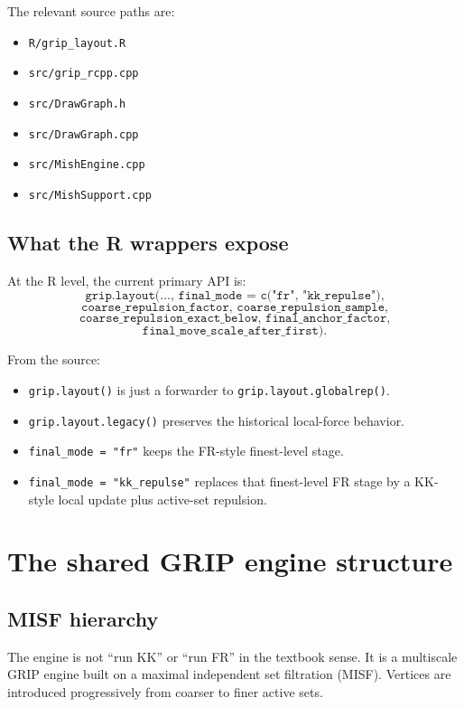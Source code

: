\documentclass[11pt]{article}
\begin{document}
The relevant source paths are:
\begin{itemize}[leftmargin=1.5em]
\item \texttt{R/grip\_layout.R}
\item \texttt{src/grip\_rcpp.cpp}
\item \texttt{src/DrawGraph.h}
\item \texttt{src/DrawGraph.cpp}
\item \texttt{src/MishEngine.cpp}
\item \texttt{src/MishSupport.cpp}
\end{itemize}

\subsection{What the R wrappers expose}

At the R level, the current primary API is:
\[
\texttt{grip.layout(..., final\_mode = c("fr", "kk\_repulse"),}
\]
\[
\texttt{coarse\_repulsion\_factor, coarse\_repulsion\_sample,}
\]
\[
\texttt{coarse\_repulsion\_exact\_below, final\_anchor\_factor,}
\]
\[
\texttt{final\_move\_scale\_after\_first).}
\]

From the source:
\begin{itemize}[leftmargin=1.5em]
\item \texttt{grip.layout()} is just a forwarder to
\texttt{grip.layout.globalrep()}.
\item \texttt{grip.layout.legacy()} preserves the historical local-force behavior.
\item \texttt{final\_mode = "fr"} keeps the FR-style finest-level stage.
\item \texttt{final\_mode = "kk\_repulse"} replaces that finest-level FR stage by
a KK-style local update plus active-set repulsion.
\end{itemize}

\section{The shared GRIP engine structure}

\subsection{MISF hierarchy}

The engine is not ``run KK'' or ``run FR'' in the textbook sense. It is a
multiscale GRIP engine built on a maximal independent set filtration (MISF).
Vertices are introduced progressively from coarser to finer active sets.
\end{document}
